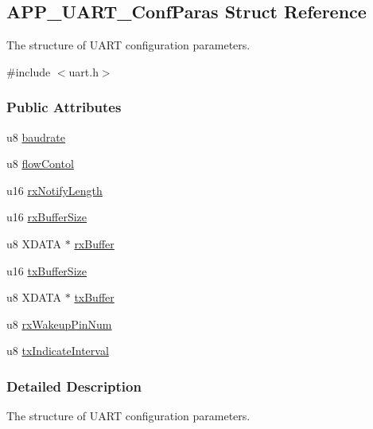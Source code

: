 \hypertarget{struct_a_p_p___u_a_r_t___conf_paras}{}\subsection{A\+P\+P\+\_\+\+U\+A\+R\+T\+\_\+\+Conf\+Paras Struct Reference}
\label{struct_a_p_p___u_a_r_t___conf_paras}


The structure of U\+A\+RT configuration parameters.  




{\ttfamily \#include $<$uart.\+h$>$}

\subsubsection*{Public Attributes}
\begin{DoxyCompactItemize}
\item 
u8 \hyperlink{struct_a_p_p___u_a_r_t___conf_paras_a44c82eefdb9983db1acd6ca61e7ae2da}{baudrate}
\item 
u8 \hyperlink{struct_a_p_p___u_a_r_t___conf_paras_a874c375f80b2329e3a1cb485d94b9cb3}{flow\+Contol}
\item 
u16 \hyperlink{struct_a_p_p___u_a_r_t___conf_paras_a2bbafd648dba36ed57035ab029c31104}{rx\+Notify\+Length}
\item 
u16 \hyperlink{struct_a_p_p___u_a_r_t___conf_paras_aa600bf0e3bc9cb82642d01d348378c82}{rx\+Buffer\+Size}
\item 
u8 X\+D\+A\+TA $\ast$ \hyperlink{struct_a_p_p___u_a_r_t___conf_paras_a7647cd1d40dbdbde863d7a3efa6321e8}{rx\+Buffer}
\item 
u16 \hyperlink{struct_a_p_p___u_a_r_t___conf_paras_a82655de0151751621b334938ee53bd8d}{tx\+Buffer\+Size}
\item 
u8 X\+D\+A\+TA $\ast$ \hyperlink{struct_a_p_p___u_a_r_t___conf_paras_a630a0cba4876c9d9139695ac3b7c7ca5}{tx\+Buffer}
\item 
u8 \hyperlink{struct_a_p_p___u_a_r_t___conf_paras_a090955f2d6580707c9550c1f5139b41e}{rx\+Wakeup\+Pin\+Num}
\item 
u8 \hyperlink{struct_a_p_p___u_a_r_t___conf_paras_aaf8ef206c38d3b47a4e730f799c82846}{tx\+Indicate\+Interval}
\end{DoxyCompactItemize}


\subsubsection{Detailed Description}
The structure of U\+A\+RT configuration parameters. 

